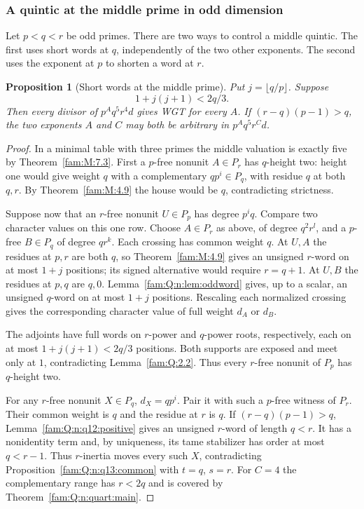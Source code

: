 \documentclass[11pt,a4paper]{article}
\numberwithin{equation}{section}
\newtheorem{proposition}[theorem]{Proposition}
\theoremstyle{remark}
\begin{document}
\subsubsection{A quintic at the middle prime in odd dimension}\label{fam:Q:sec:5.1}\label{fam:Q:n:q13:middle}
Let $p<q<r$ be odd primes. There are two ways to control a
middle quintic. The first uses short words at $q$, independently
of the two other exponents. The second uses the exponent at $p$
to shorten a word at $r$.

\begin{proposition}[Short words at the middle prime]\label{fam:Q:5.5}\label{fam:Q:n:q13:middle-small}
Put $j=\lfloor q/p\rfloor$. Suppose
\[
                        1+j(j+1)<2q/3 .
\]
Then every divisor of $p^A q^5 r^4d$ gives WGT for every $A$.
If $(r-q)(p-1)>q$, the two exponents $A$ and $C$ may both be
arbitrary in $p^A q^5 r^C d$.
\end{proposition}
\begin{proof}
In a minimal table with three primes the middle valuation is
exactly five by Theorem~\ref{fam:M:7.3}. First a $p$-free
nonunit $A\in P_r$ has $q$-height two: height one would give
weight $q$ with a complementary $qp^i\in P_q$, with residue
$q$ at both $q,r$. By Theorem~\ref{fam:M:4.9} the house would
be $q$, contradicting strictness.

Suppose now that an $r$-free nonunit $U\in P_p$ has degree
$p^i q$. Compare two character values on this one row. Choose
$A\in P_r$ as above, of degree $q^2 r^l$, and a $p$-free
$B\in P_q$ of degree $qr^k$. Each crossing has common weight
$q$. At $U,A$ the residues at $p,r$ are both $q$, so
Theorem~\ref{fam:M:4.9} gives an unsigned $r$-word on at most
$1+j$ positions; its signed alternative would require $r=q+1$.
At $U,B$ the residues at $p,q$ are $q,0$. Lemma~\ref{fam:Q:n:lem:oddword}
gives, up to a scalar, an unsigned $q$-word on at most $1+j$
positions. Rescaling each normalized crossing gives the
corresponding character value of full weight $d_A$ or $d_B$.

The adjoints have full words on $r$-power and $q$-power roots,
respectively, each on at most $1+j(j+1)<2q/3$ positions. Both
supports are exposed and meet only at $1$, contradicting
Lemma~\ref{fam:Q:2.2}. Thus every $r$-free nonunit of $P_p$
has $q$-height two.

For any $r$-free nonunit $X\in P_q$, $d_X=qp^i$.
Pair it with such a $p$-free witness of $P_r$. Their common
weight is $q$ and the residue at $r$ is $q$. If
$(r-q)(p-1)>q$, Lemma~\ref{fam:Q:n:q12:positive} gives an unsigned
$r$-word of length $q<r$. It has a nonidentity term and,
by uniqueness, its tame stabilizer has order at most $q<r-1$.
Thus $r$-inertia moves every such $X$, contradicting
Proposition~\ref{fam:Q:n:q13:common} with $t=q$, $s=r$.
For $C=4$ the complementary range has $r<2q$ and is covered by
Theorem~\ref{fam:Q:n:quart:main}.
\end{proof}
\end{document}
